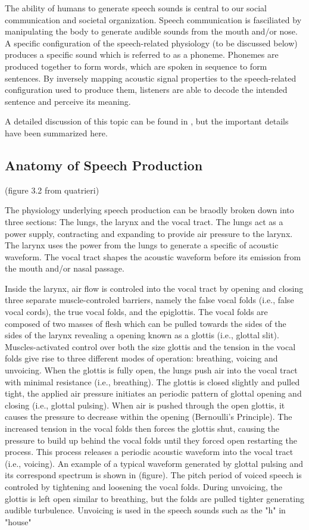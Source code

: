 The ability of humans to generate speech sounds is central to our social communication and societal organization. Speech communication is fasciliated by manipulating the body to generate audible sounds from the mouth and/or nose. A specific configuration of the speech-related physiology (to be discussed below) produces a specific sound which is referred to as a phoneme. Phonemes are produced together to form words, which are spoken in sequence to form sentences. By inversely mapping acoustic signal properties to the speech-related configuration used to produce them, listeners are able to decode the intended sentence and perceive its meaning.

A detailed discussion of this topic can be found in \cite{quatieri2002discrete}, but the important details have been summarized here.

\subsection{Anatomy of Speech Production}

(figure 3.2 from quatrieri)

The physiology underlying speech production can be braodly broken down into three sections: The lungs, the larynx and the vocal tract. The lungs act as a power supply, contracting and expanding to provide air pressure to the larynx. The larynx uses the power from the lungs to generate a specific of acoustic waveform. The vocal tract shapes the acoustic waveform before its emission from the mouth and/or nasal passage. 

Inside the larynx, air flow is controled into the vocal tract by opening and closing three separate muscle-controled barriers, namely the false vocal folds (i.e., false vocal cords), the true vocal folds, and the epiglottis. The vocal folds are composed of two masses of flesh which can be pulled towards the sides of the sides of the larynx revealing a opening known as a glottis (i.e., glottal slit). Muscles-activated control over both the size glottis and the tension in the vocal folds give rise to three different modes of operation: breathing, voicing and unvoicing. When the glottis is fully open, the lungs push air into the vocal tract with minimal resistance (i.e., breathing). The glottis is closed slightly and pulled tight, the applied air pressure initiates an periodic pattern of glottal opening and closing (i.e., glottal pulsing). When air is pushed through the open glottis, it causes the pressure to decrease within the opening (Bernoulli's Principle). The increased tension in the vocal folds then forces the glottis shut, causing the pressure to build up behind the vocal folds until they forced open restarting the process. This process releases a periodic acoustic waveform into the vocal tract (i.e., voicing). An example of a typical waveform generated by glottal pulsing and its correspond spectrum is shown in (figure). The pitch period of voiced speech is controled by tightening and loosening the vocal folds. During unvoicing, the glottis is left open similar to breathing, but the folds are pulled tighter generating audible turbulence. Unvoicing is used in the speech sounds such as the "h" in "house"

